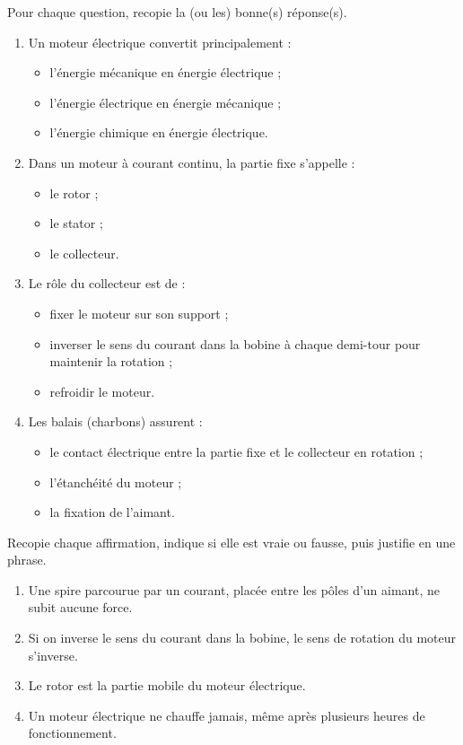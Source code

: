 \documentclass[11pt]{article}
\begin{document}
\begin{exercice}
Pour chaque question, recopie la (ou les) bonne(s) réponse(s).
\begin{enumerate}
\item Un moteur électrique convertit principalement :
\begin{itemize}
\item[a)] l'énergie mécanique en énergie électrique ;
\item[b)] l'énergie électrique en énergie mécanique ;
\item[c)] l'énergie chimique en énergie électrique.
\end{itemize}
\item Dans un moteur à courant continu, la partie fixe s'appelle :
\begin{itemize}
\item[a)] le rotor ; \item[b)] le stator ; \item[c)] le collecteur.
\end{itemize}
\item Le rôle du collecteur est de :
\begin{itemize}
\item[a)] fixer le moteur sur son support ;
\item[b)] inverser le sens du courant dans la bobine à chaque demi-tour pour maintenir la rotation ;
\item[c)] refroidir le moteur.
\end{itemize}
\item Les balais (charbons) assurent :
\begin{itemize}
\item[a)] le contact électrique entre la partie fixe et le collecteur en rotation ;
\item[b)] l'étanchéité du moteur ;
\item[c)] la fixation de l'aimant.
\end{itemize}
\end{enumerate}
\end{exercice}

\begin{exercice}
Recopie chaque affirmation, indique si elle est vraie ou fausse, puis justifie en une phrase.
\begin{enumerate}
\item Une spire parcourue par un courant, placée entre les pôles d'un aimant, ne subit aucune force.
\item Si on inverse le sens du courant dans la bobine, le sens de rotation du moteur s'inverse.
\item Le rotor est la partie mobile du moteur électrique.
\item Un moteur électrique ne chauffe jamais, même après plusieurs heures de fonctionnement.
\end{enumerate}
\end{exercice}
\end{document}
